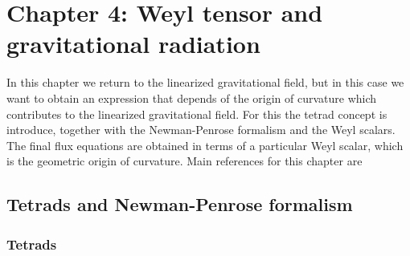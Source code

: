 \chapter{Chapter 4: Weyl tensor and gravitational radiation}
In this chapter we return to the linearized gravitational field, but in this case we want to obtain an expression that depends of the origin of curvature which contributes to the linearized gravitational field. For this the tetrad concept is introduce, together with the Newman-Penrose formalism and the Weyl scalars. The final flux equations are obtained in terms of a particular Weyl scalar, which is the geometric origin of curvature. Main references for this chapter are \cite{Chandrasekhar,Alcubierre,Ruiz}
\section{Tetrads and Newman-Penrose formalism}
\subsection{Tetrads}

